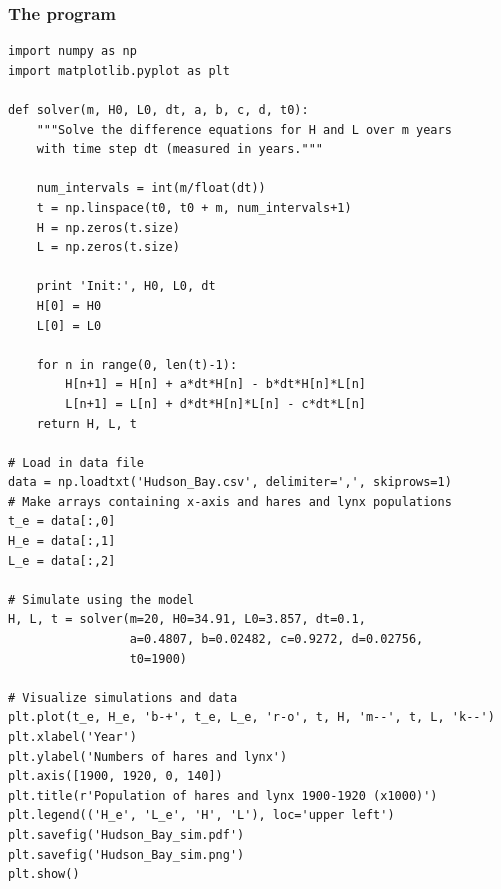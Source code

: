 \documentclass{beamer}
\begin{document}
\begin{frame}
\frametitle{The program}

\begin{block}{}
\begin{verbatim}
import numpy as np
import matplotlib.pyplot as plt

def solver(m, H0, L0, dt, a, b, c, d, t0):
    """Solve the difference equations for H and L over m years
    with time step dt (measured in years."""

    num_intervals = int(m/float(dt))
    t = np.linspace(t0, t0 + m, num_intervals+1)
    H = np.zeros(t.size)
    L = np.zeros(t.size)

    print 'Init:', H0, L0, dt
    H[0] = H0
    L[0] = L0

    for n in range(0, len(t)-1):
        H[n+1] = H[n] + a*dt*H[n] - b*dt*H[n]*L[n]
        L[n+1] = L[n] + d*dt*H[n]*L[n] - c*dt*L[n]
    return H, L, t

# Load in data file
data = np.loadtxt('Hudson_Bay.csv', delimiter=',', skiprows=1)
# Make arrays containing x-axis and hares and lynx populations
t_e = data[:,0]
H_e = data[:,1]
L_e = data[:,2]

# Simulate using the model
H, L, t = solver(m=20, H0=34.91, L0=3.857, dt=0.1,
                 a=0.4807, b=0.02482, c=0.9272, d=0.02756,
                 t0=1900)

# Visualize simulations and data
plt.plot(t_e, H_e, 'b-+', t_e, L_e, 'r-o', t, H, 'm--', t, L, 'k--')
plt.xlabel('Year')
plt.ylabel('Numbers of hares and lynx')
plt.axis([1900, 1920, 0, 140])
plt.title(r'Population of hares and lynx 1900-1920 (x1000)')
plt.legend(('H_e', 'L_e', 'H', 'L'), loc='upper left')
plt.savefig('Hudson_Bay_sim.pdf')
plt.savefig('Hudson_Bay_sim.png')
plt.show()
\end{verbatim}
\end{block}
\end{frame}
\end{document}
